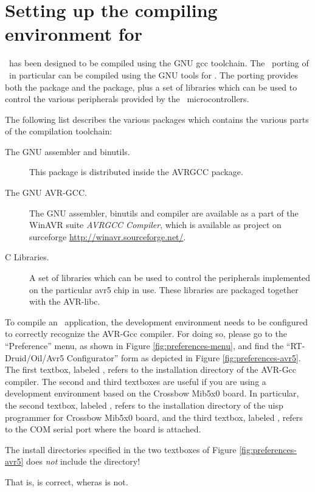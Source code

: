 \section{Setting up the compiling environment for \avr}

\ee\ has been designed to be compiled using the GNU gcc toolchain.
The \avr\ porting of \ee\ in particular can be compiled using the GNU
tools for \avr. The porting provides both the  package
and the  package, plus a set of libraries which can be used
to control the various peripherals provided by the \avr\
microcontrollers.

The following list describes the various packages which contains the
various parts of the compilation toolchain:
\begin{description}
\item[The GNU assembler and binutils.] This package is distributed
  inside the AVRGCC package.
\item[The GNU AVR-GCC.] The GNU assembler, binutils and compiler are
  available as a part of the WinAVR suite {\em AVRGCC Compiler}, which
  is available as project on surceforge \url{http://winavr.sourceforge.net/}.

\item[C Libraries.] A set of libraries which can be used to control
  the peripherals implemented on the particular avr5 chip in
  use. These libraries are packaged together with the AVR-libc.
\end{description}

To compile an \ee\ application, the development
environment needs to be configured to correctly recognize the AVR-Gcc
compiler. For doing so, please go to the ``Preference'' menu, as shown
in Figure \ref{fig:preferences-menu}, and find the ``RT-Druid/Oil/Avr5
Configurator'' form as depicted in Figure \ref{fig:preferences-avr5}.
The first textbox, labeled \const{Gcc path}, refers to the
installation directory of the AVR-Gcc compiler.  The second and third
textboxes are useful if you are using a development environment based
on the Crossbow Mib5x0 board. In particular, the second textbox,
labeled \const{Uisp path}, refers to the installation directory of the
uisp programmer for Crossbow Mib5x0 board, and the third textbox,
labeled \const{Serial port device}, refers to the COM serial port
where the board is attached.


\begin{warning}
The install directories specified in the two textboxes of Figure
\ref{fig:preferences-avr5} does {\em not} include the \file{bin}
directory! 

That is,  is correct, wheras
 is not.
\end{warning}


